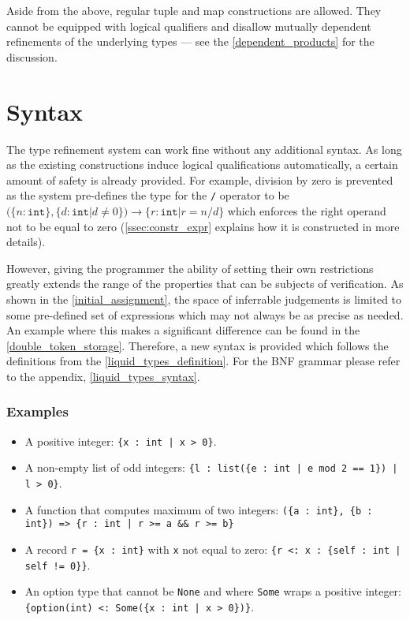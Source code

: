 Aside from the above, regular tuple and map constructions are allowed. They
cannot be equipped with logical qualifiers and disallow mutually dependent
refinements of the underlying types --- see the \autoref{dependent_products} for
the discussion.

\section{Syntax}

The type refinement system can work fine without any additional syntax. As long
as the existing constructions induce logical qualifications automatically, a
certain amount of safety is already provided. For example, division by zero is
prevented as the system pre-defines the type for the \texttt{/} operator to be
$(\{n : \texttt{int}\}, \{d : \texttt{int} | d \neq 0\}) \to \{r : \texttt{int}
| r = n / d\}$ which enforces the right operand not to be equal to zero
(\autoref{ssec:constr_expr} explains how it is constructed in more details).

However, giving the programmer the ability of setting their own restrictions
greatly extends the range of the properties that can be subjects of
verification. As shown in the \autoref{initial_assignment}, the space of
inferrable judgements is limited to some pre-defined set of expressions which
may not always be as precise as needed. An example where this makes a
significant difference can be found in the \autoref{double_token_storage}.
Therefore, a new syntax is provided which follows the definitions from the
\autoref{liquid_types_definition}. For the BNF grammar please refer to the
appendix, \autoref{liquid_types_syntax}.

\subsubsection{Examples}

\begin{itemize}
\item A positive integer: \texttt{\{x : int | x > 0\}}.
\item A non-empty list of odd integers: \texttt{\{l : list(\{e : int | e mod 2
    == 1\}) | l > 0\}}.
\item A function that computes maximum of two integers: \texttt{(\{a : int\},
    \{b : int\}) => \{r : int | r >= a \&\& r >= b\}}
\item A record \texttt{r = \{x : int\}} with \texttt{x} not equal to zero:
  \texttt{\{r <: x : \{self : int | self != 0\}\}}.
\item An option type that cannot be \texttt{None} and where \texttt{Some} wraps
  a positive integer: \texttt{\{option(int) <: Some(\{x : int | x > 0\})\}}.
\end{itemize}

